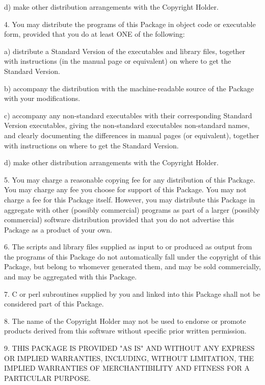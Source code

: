 \documentclass{doc}
\begin{document}
d) make other distribution arrangements with the Copyright Holder.


4. You may distribute the programs of this Package in object code or executable form,
provided that you do at least ONE of the following:


a) distribute a Standard Version of the executables and library files, together with
instructions (in the manual page or equivalent) on where to get the Standard Version.

b) accompany the distribution with the machine-readable source of the Package with your
modifications.

c) accompany any non-standard executables with their corresponding Standard Version
executables, giving the non-standard executables non-standard names, and clearly
documenting the differences in manual pages (or equivalent), together with instructions on
where to get the Standard Version.

d) make other distribution arrangements with the Copyright Holder.


5. You may charge a reasonable copying fee for any distribution of this Package. You may
charge any fee you choose for support of this Package. You may not charge a fee for this
Package itself. However, you may distribute this Package in aggregate with other (possibly
commercial) programs as part of a larger (possibly commercial) software distribution
provided that you do not advertise this Package as a product of your own.

6. The scripts and library files supplied as input to or produced as output from the
programs of this Package do not automatically fall under the copyright of this Package,
but belong to whomever generated them, and may be sold commercially, and may be aggregated
with this Package.

7. C or perl subroutines supplied by you and linked into this Package shall not be
considered part of this Package.

8. The name of the Copyright Holder may not be used to endorse or promote products derived
from this software without specific prior written permission.

9. THIS PACKAGE IS PROVIDED "AS IS" AND WITHOUT ANY EXPRESS OR IMPLIED WARRANTIES,
INCLUDING, WITHOUT LIMITATION, THE IMPLIED WARRANTIES OF MERCHANTIBILITY AND FITNESS FOR A
PARTICULAR PURPOSE.

\end{document}
